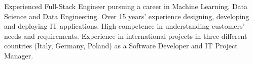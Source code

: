 %
%
%
\par{
Experienced Full-Stack Engineer pursuing a career in Machine Learning, Data Science and Data Engineering.
Over 15 years' experience designing, developing and deploying IT applications.
High competence in understanding customers' needs and requirements. 
Experience in international projects in three different countries (Italy, Germany, Poland) as a Software Developer and IT Project Manager. 
}